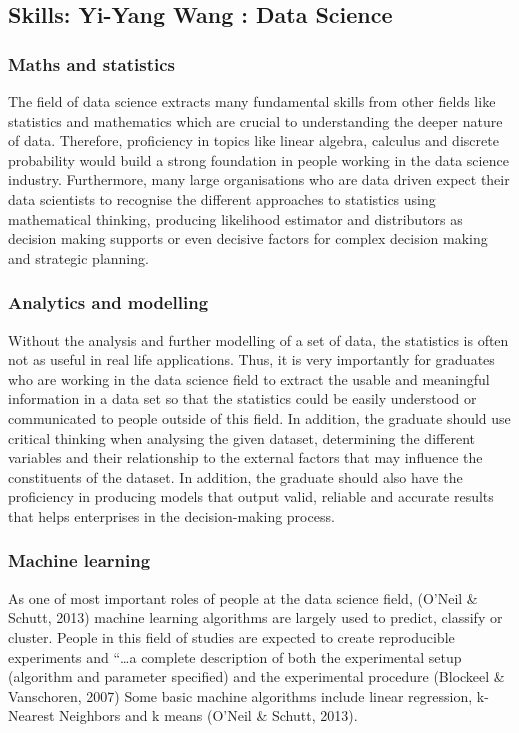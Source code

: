 \documentclass[a4paper, 11pt]{report}
\begin{document}
\subsection{Skills: Yi-Yang Wang : Data Science}

\subsubsection{Maths and statistics}
The field of data science extracts many fundamental skills from other fields like statistics and mathematics which are crucial to understanding the deeper nature of data. Therefore, proficiency in topics like \cite{radovilsky2018skills} linear algebra, calculus and discrete probability would build a strong foundation in people working in the data science industry. Furthermore, many large organisations who are data driven expect their data scientists to recognise the different approaches to statistics using mathematical thinking, producing likelihood estimator and distributors as decision making supports or even decisive factors \cite{cao2017data} for complex decision making and strategic planning. 

\subsubsection{Analytics and modelling}
Without the analysis and further modelling of a set of data, the statistics is often not as useful in real life applications. Thus, it is very importantly for graduates who are working in the data science field to extract the usable and meaningful information in a data set so that the statistics could be easily understood or communicated to people outside of this field. In addition, the graduate should use critical thinking when analysing the given dataset, determining the different variables and their relationship to the external factors that may influence the constituents of the dataset. In addition, the graduate should also have the proficiency in producing models that output valid, reliable and accurate results that helps enterprises in the decision-making process.

\subsubsection{Machine learning}
As one of most important roles of people at the data science field, (O’Neil \& Schutt, 2013) machine learning algorithms are largely used to predict, classify or cluster. People in this field of studies are expected to create reproducible experiments and “…a complete description of both the experimental setup (algorithm and parameter specified) and the experimental procedure (Blockeel \& Vanschoren, 2007) Some basic machine algorithms include linear regression, k-Nearest Neighbors and k means (O’Neil \& Schutt, 2013). 
\end{document}
